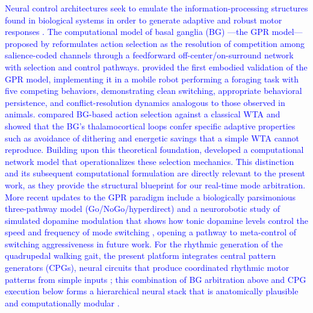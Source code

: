 \documentclass[preprint,12pt]{elsarticle}
\newcommand{\revblue}[1]{\textcolor{blue}{#1}}
\begin{document}
\revblue{Neural control architectures seek to emulate the information-processing structures found in biological systems in order to generate adaptive and robust motor responses \citep{mead1990neuromorphic,ijspeert2008}. The computational model of basal ganglia (BG) ---the GPR model--- proposed by \citet{Gurney2001a,Gurney2001b} reformulates action selection as the resolution of competition among salience-coded channels through a feedforward off-center/on-surround network with selection and control pathways. \citet{Prescott2006Robot} provided the first embodied validation of the GPR model, implementing it in a mobile robot performing a foraging task with five competing behaviors, demonstrating clean switching, appropriate behavioral persistence, and conflict-resolution dynamics analogous to those observed in animals. \citet{Girard2003Basal} compared BG-based action selection against a classical WTA and showed that the BG's thalamocortical loops confer specific adaptive properties such as avoidance of dithering and energetic savings that a simple WTA cannot reproduce. Building upon this theoretical foundation, \citet{sarvestani2013computational} developed a computational network model that operationalizes these selection mechanics. This distinction and its subsequent computational formulation are directly relevant to the present work, as they provide the structural blueprint for our real-time mode arbitration. More recent updates to the GPR paradigm include a biologically parsimonious three-pathway model (Go/NoGo/hyperdirect) \citep{Baston2015Biologically} and a neurorobotic study of simulated dopamine modulation that shows how tonic dopamine levels control the speed and frequency of mode switching \citep{Prescott2024Simulated}, opening a pathway to meta-control of switching aggressiveness in future work. For the rhythmic generation of the quadrupedal walking gait, the present platform integrates central pattern generators (CPGs), neural circuits that produce coordinated rhythmic motor patterns from simple inputs \citep{ijspeert2008}; this combination of BG arbitration above and CPG execution below forms a hierarchical neural stack that is anatomically plausible and computationally modular \citep{Bellegarda2022CPGRL,Manoonpong2013Neural}.}
\end{document}

